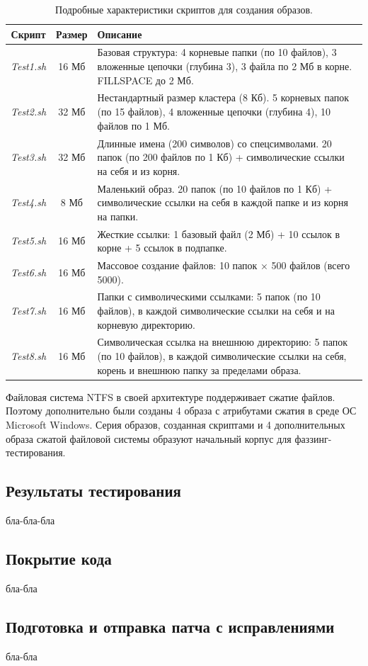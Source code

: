 \begin{table}[htbp]
	\renewcommand{\arraystretch}{1.5}
	\centering
	\begin{tabular}{|c|c|p{10cm}|}
		\hline
		\textbf{Скрипт} & \textbf{Размер} & \textbf{Описание} \\
		\hline
		\textit{Test1.sh} & 16 Мб & Базовая структура: 4 корневые папки (по 10 файлов), 3 вложенные цепочки (глубина 3), 3 файла по 2 Мб в корне. FILLSPACE до 2 Мб. \\
		\hline
		\textit{Test2.sh} & 32 Мб & Нестандартный размер кластера (8 Кб). 5 корневых папок (по 15 файлов), 4 вложенные цепочки (глубина 4), 10 файлов по 1 Мб.\\
		\hline
		\textit{Test3.sh} & 32 Мб &Длинные имена (200 символов) со спецсимволами. 20 папок (по 200 файлов по 1 Кб) + символические ссылки на себя и из корня. \\
		\hline
		\textit{Test4.sh} & 8 Мб & Маленький образ. 20 папок (по 10 файлов по 1 Кб) + символические ссылки на себя в каждой папке и из корня на папки.\\
		\hline
		\textit{Test5.sh} & 16 Мб & Жесткие ссылки: 1 базовый файл (2 Мб) + 10 ссылок в корне + 5 ссылок в подпапке.\\
		\hline
		\textit{Test6.sh} & 16 Мб & Массовое создание файлов: 10 папок × 500 файлов (всего 5000). \\
		\hline
		\textit{Test7.sh} & 16 Мб & Папки с символическими ссылками: 5 папок (по 10 файлов), в каждой символические ссылки на себя и на корневую директорию.\\
		\hline
		\textit{Test8.sh} & 16 Мб & Символическая ссылка на внешнюю директорию: 5 папок (по 10 файлов), в каждой символические ссылки на себя, корень и внешнюю папку за пределами образа.\\
		\hline
	\end{tabular}
	\caption{Подробные характеристики скриптов для создания образов.}
	\label{tab:tests_detail}
\end{table}

Файловая система NTFS в своей архитектуре поддерживает сжатие файлов. Поэтому дополнительно были созданы 4 образа с атрибутами сжатия в среде ОС Microsoft Windows.  Серия образов, созданная скриптами и 4 дополнительных образа сжатой файловой системы образуют начальный корпус для фаззинг-тестирования.

\subsection{Результаты тестирования}

бла-бла-бла

\subsection{Покрытие кода}

бла-бла

\subsection{Подготовка и отправка патча с исправлениями}

бла-бла
